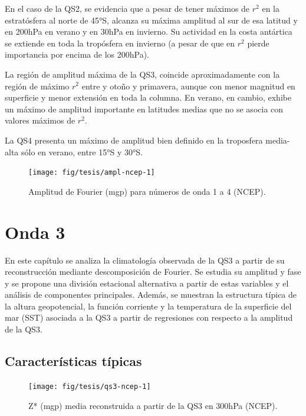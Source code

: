 \documentclass[spanish,a4paper,12pt,oneside]{book}
\begin{document}
En el caso de la QS2, se evidencia que a pesar de tener máximos de
\(r^2\) en la estratósfera al norte de 45°S, alcanza su máxima amplitud
al sur de esa latitud y en 200hPa en verano y en 30hPa en invierno. Su
actividad en la costa antártica se extiende en toda la tropósfera en
invierno (a pesar de que en \(r^2\) pierde importancia por encima de los
200hPa).

La región de amplitud máxima de la QS3, coincide aproximadamente con la
región de máximo \(r^2\) entre y otoño y primavera, aunque con menor
magnitud en superficie y menor extensión en toda la columna. En verano,
en cambio, exhibe un máximo de amplitud importante en latitudes medias
que no se asocia con valores máximos de \(r^2\).

La QS4 presenta un máximo de amplitud bien definido en la troposfera
media-alta sólo en verano, entre 15°S y 30°S.

\begin{landscape}\begin{figure}

{\centering \texttt{[image: fig/tesis/ampl-ncep-1]} 

}

\caption{Amplitud de Fourier (mgp) para números de onda 1 a 4 (NCEP).}\label{fig:ampl-ncep}
\end{figure}
\end{landscape}

\chapter{Onda 3}\label{onda-3}

En este capítulo se analiza la climatología observada de la QS3 a partir
de su reconstrucción mediante descomposición de Fourier. Se estudia su
amplitud y fase y se propone una división estacional alternativa a
partir de estas variables y el análisis de componentes principales.
Además, se muestran la estructura típica de la altura geopotencial, la
función corriente y la temperatura de la superficie del mar (SST)
asociada a la QS3 a partir de regresiones con respecto a la amplitud de
la QS3.

\section{Características típicas}\label{caracteristicas-tipicas}

\begin{figure}
\texttt{[image: fig/tesis/qs3-ncep-1]} \caption{Z* (mgp) media reconstruida a partir de la QS3 en 300hPa (NCEP).}\label{fig:qs3-ncep}
\end{figure}
\end{document}
